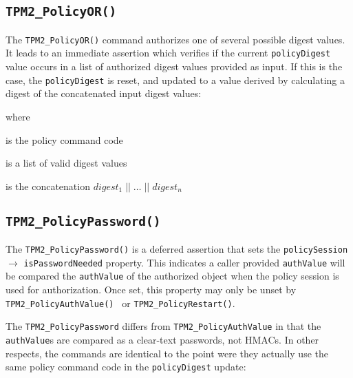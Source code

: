 \documentclass{sig-alternate-2013}
\begin{document}
\subsection{\texttt{TPM2\_PolicyOR()}}

The \texttt{TPM2\_PolicyOR()} command authorizes one of several possible digest
values. It leads to an immediate assertion which verifies if the current
\texttt{policyDigest} value occurs in a list of authorized digest values
provided as input. If this is the case, the \texttt{policyDigest} is reset, and
updated to a value derived by calculating a digest of the concatenated input
digest values:

\vspace{.5\baselineskip}
\noindent
{}

\vspace{.5\baselineskip}
\noindent where

\begin{description}
  \small
  \item[$TPM\_CC\_PolicyOR$] \hfill is the policy command code
  \item[$digest_{1} \ldots digest_{n}$] \hfill is a list of valid digest values\footnotemark
  \item[$digests$] \hfill is the concatenation $digest_{1}\;||\;\ldots\;||\;digest_{n}$
\end{description}

\subsection{\texttt{TPM2\_PolicyPassword()}}

The \texttt{TPM2\_PolicyPassword()} is a deferred assertion that sets the
\texttt{policySession} $\rightarrow$ \texttt{isPasswordNeeded} property. This
indicates a caller provided \texttt{authValue} will be compared the
\texttt{authValue} of the authorized object when the policy session is used for
authorization. Once set, this property may only be unset by
\texttt{TPM2\_PolicyAuthValue() } or \texttt{TPM2\_PolicyRestart()}.

The \texttt{TPM2\_PolicyPassword} differs from \texttt{TPM2\_PolicyAuthValue} in
that the \texttt{authValue}s  are compared as a clear-text passwords, not HMACs.
In other respects, the commands are identical to the point were they actually
use the same policy command code in the \texttt{policyDigest} update:
 
\end{document}
